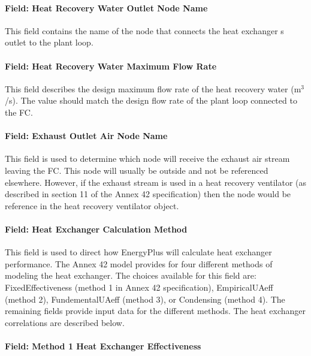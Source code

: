 \paragraph{Field: Heat Recovery Water Outlet Node Name}\label{field-heat-recovery-water-outlet-node-name-1}

This field contains the name of the node that connects the heat exchanger s outlet to the plant loop.

\paragraph{Field: Heat Recovery Water Maximum Flow Rate}\label{field-heat-recovery-water-maximum-flow-rate}

This field describes the design maximum flow rate of the heat recovery water (m\(^{3}\)/s). The value should match the design flow rate of the plant loop connected to the FC.

\paragraph{Field: Exhaust Outlet Air Node Name}\label{field-exhaust-outlet-air-node-name}

This field is used to determine which node will receive the exhaust air stream leaving the FC. This node will usually be outside and not be referenced elsewhere. However, if the exhaust stream is used in a heat recovery ventilator (as described in section 11 of the Annex 42 specification) then the node would be reference in the heat recovery ventilator object.

\paragraph{Field: Heat Exchanger Calculation Method}\label{field-heat-exchanger-calculation-method}

This field is used to direct how EnergyPlus will calculate heat exchanger performance. The Annex 42 model provides for four different methods of modeling the heat exchanger. The choices available for this field are: FixedEffectiveness (method 1 in Annex 42 specification), EmpiricalUAeff (method 2), FundementalUAeff (method 3), or Condensing (method 4). The remaining fields provide input data for the different methods. The heat exchanger correlations are described below.

\paragraph{Field: Method 1 Heat Exchanger Effectiveness}\label{field-method-1-heat-exchanger-effectiveness}

